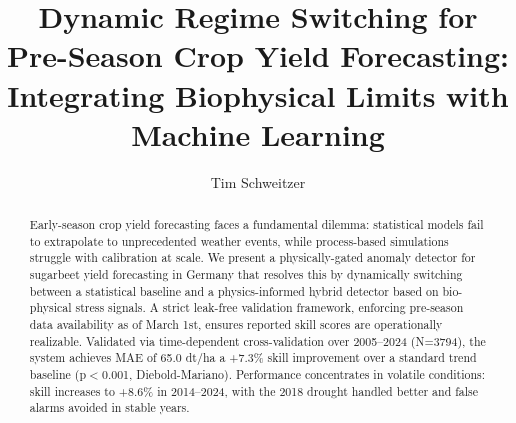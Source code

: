 \documentclass{llncs}
\title{Dynamic Regime Switching for Pre-Season Crop Yield Forecasting: Integrating Biophysical Limits with Machine Learning}
\author{Tim Schweitzer}
\institute{
RWU Hochschule Ravensburg-Weingarten University of Applied Sciences, Germany \\
\email{tim.schweitzer@hs-weingarten.de}}
\begin{document}
\maketitle

\begin{abstract}
Early-season crop yield forecasting faces a fundamental dilemma: statistical models fail to extrapolate to unprecedented weather events, while process-based simulations struggle with calibration at scale. We present a physically-gated anomaly detector for sugarbeet yield forecasting in Germany that resolves this by dynamically switching between a statistical baseline and a physics-informed hybrid detector based on bio-physical stress signals. A strict leak-free validation framework, enforcing pre-season data availability as of March 1st, ensures reported skill scores are operationally realizable. Validated via time-dependent cross-validation over 2005–2024 (N=3794), the system achieves MAE of 65.0 dt/ha a +7.3\% skill improvement over a standard trend baseline (p$<$0.001, Diebold-Mariano). Performance concentrates in volatile conditions: skill increases to +8.6\% in 2014–2024, with the 2018 drought handled better and false alarms avoided in stable years.
\end{abstract}









\end{document}
